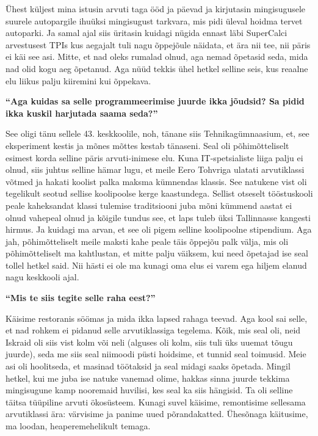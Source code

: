 Ühest küljest  mina istusin arvuti taga ööd ja päevad ja kirjutasin 
mingisugusele suurele autopargile ihuüksi  mingisugust tarkvara, mis pidi 
üleval hoidma tervet autoparki. Ja samal ajal siis üritasin kuidagi nügida 
ennast läbi SuperCalci arvestusest TPIs kus 
aegajalt tuli nagu õppejõule näidata, et ära nii tee, nii päris ei käi see asi. 
Mitte, et nad oleks rumalad olnud, aga nemad õpetasid seda, mida nad olid kogu 
aeg õpetanud. Aga nüüd tekkis ühel hetkel selline seis, kus reaalne elu liikus 
palju kiiremini kui õppekava.

\textbf{\enquote{Aga kuidas sa selle programmeerimise juurde ikka jõudsid? Sa 
pidid ikka kuskil harjutada saama seda?}}

See oligi  tänu sellele 43. keskkoolile, noh, tänane siis 
Tehnikagümnaasium, 
et, see eksperiment kestis ja mõnes mõttes kestab tänaseni. Seal oli 
põhimõtteliselt  esimest korda selline päris arvuti-inimese elu. Kuna 
IT-spetsialiste  liiga palju ei olnud, siis juhtus selline hämar lugu, et meile 
Eero Tohvriga ulatati arvutiklassi võtmed ja hakati 
koolist palka maksma kümnendas klassis. See natukene vist oli tegelikult seotud 
sellise koolipoolse kerge kaastundega. Sellist otseselt tööstuskooli peale 
kaheksandat klassi tulemise traditsiooni juba mõni kümmend aastat ei olnud 
vahepeal olnud ja kõigile tundus see, et laps tuleb üksi Tallinnasse kangesti 
hirmus. Ja kuidagi ma arvan, et see oli pigem selline koolipoolne stipendium. 
Aga jah, põhimõtteliselt meile maksti kahe peale täis õppejõu palk välja, mis 
oli põhimõtteliselt ma kahtlustan, et mitte palju väiksem, kui need õpetajad 
ise seal tollel hetkel said. Nii hästi ei ole ma kunagi oma elus ei varem ega 
hiljem elanud nagu keskkooli ajal. 

\textbf{\enquote{Mis te siis tegite selle raha eest?}}

Käisime restoranis söömas ja mida ikka lapsed rahaga teevad. Aga kool sai 
selle, et nad rohkem ei pidanud selle arvutiklassiga tegelema.  Kõik, mis seal 
oli, neid 
Iskraid oli 
siis vist kolm või neli (alguses oli kolm, siis tuli üks uuemat tõugu juurde), 
seda me siis seal niimoodi püsti hoidsime, et tunnid seal toimusid. Meie asi 
oli hoolitseda, et masinad töötaksid ja seal midagi saaks õpetada. Mingil 
hetkel, kui me juba ise natuke vanemad olime, hakkas sinna juurde tekkima 
mingisugune kamp nooremaid huvilisi, kes seal ka siis hängisid. Ta oli selline 
täitsa tüüpiline arvuti ökosüsteem. Kunagi suvel käisime, remontisime sellesama 
arvutiklassi ära: värvisime ja panime uued põrandakatted. Ühesõnaga käitusime, 
ma loodan,  heaperemehelikult temaga. 

